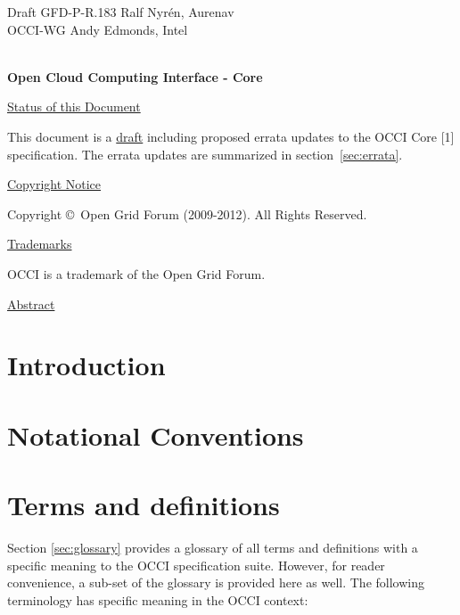 \documentclass[10pt,a4paper]{article}
\begin{document}
\thispagestyle{empty}

Draft GFD-P-R.183 \hfill  {Ralf Nyrén, Aurenav}\\
OCCI-WG \hfill  Andy Edmonds, Intel\\
\\

\vspace*{0.5in}

\begin{Large}
\textbf{Open Cloud Computing Interface - Core}
\end{Large}

\vspace*{0.5in}

\underline{Status of this Document}

%
This document is a \underline{draft} including proposed errata updates to the
OCCI Core [1] specification.
The errata updates are summarized in section~\ref{sec:errata}.

\underline{Copyright Notice}

Copyright \copyright ~Open Grid Forum (2009-2012). All Rights Reserved.

\underline{Trademarks}

OCCI is a trademark of the Open Grid Forum.

\underline{Abstract}



\newpage
\tableofcontents
\newpage

\section{Introduction}


\section{Notational Conventions}


\section{Terms and definitions}
Section \ref{sec:glossary} provides a glossary of all terms and
definitions with a specific meaning to the OCCI specification
suite. However, for reader convenience, a sub-set of the glossary is
provided here as well. The following terminology has specific meaning
in the OCCI context:
\end{document}
